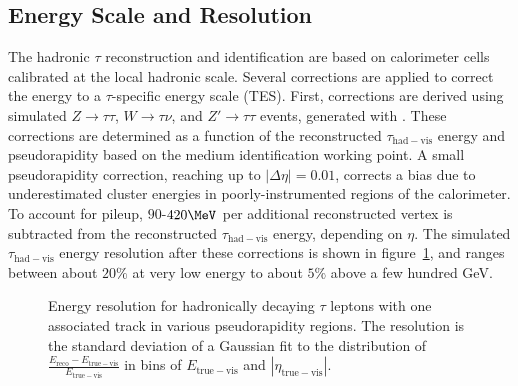 \subsection{Energy Scale and Resolution}\label{sec:reco-tau-energymomentum}
The hadronic $\tau$ reconstruction and identification are based on calorimeter cells calibrated at the local hadronic scale. Several corrections are applied to correct the energy to a $\tau$-specific energy scale (TES). First, corrections are derived using simulated $Z\rightarrow\tau\tau$, $W\rightarrow\tau\nu$, and $Z'\rightarrow\tau\tau$ events, generated with . These corrections are determined as a function of the reconstructed $\tau_{\mathrm{had-vis}}$ energy and pseudorapidity based on the medium identification working point. A small pseudorapidity correction, reaching up to $|\Delta\eta|=0.01$, corrects a bias due to underestimated cluster energies in poorly-instrumented regions of the calorimeter. To account for pileup, $90$-$420 \MeV$ per additional reconstructed vertex is subtracted from the reconstructed $\tau_{\mathrm{had-vis}}$ energy, depending on $\eta$. The simulated $\tau_{\mathrm{had-vis}}$ energy resolution after these corrections is shown in figure~\ref{fig:reco-tau-energy-resolution}, and ranges between about $20\%$ at very low energy to about $5\%$ above a few hundred GeV.

\begin{figure}[htbp]
	\centering
	\caption{Energy resolution for hadronically decaying $\tau$ leptons with one associated track in various pseudorapidity regions. The resolution is the standard deviation of a Gaussian fit to the distribution of $\frac{E_{\mathrm{reco}}-E_{\mathrm{true-vis}}}{E_{\mathrm{true-vis}}}$ in bins of $E_{\mathrm{true-vis}}$ and $|\eta_{\mathrm{true-vis}}|$.}
	\label{fig:reco-tau-energy-resolution}
\end{figure}


